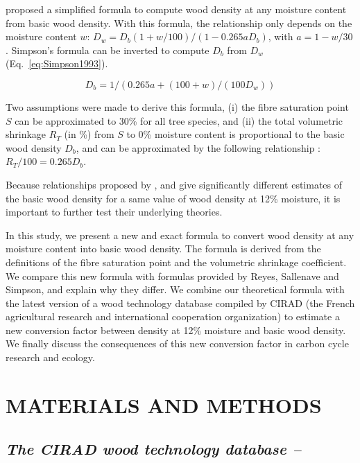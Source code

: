 \documentclass[a4paper, 12pt, leqno, dvipsnames]{article}\usepackage[]{graphicx}\usepackage[]{color}
\begin{document}
\citet{Simpson1993} proposed a simplified formula to compute wood density at any moisture content from basic wood density. With this formula, the relationship only depends on the moisture content $w$: $D_w=D_b(1+w/100)/(1-0.265aD_b)$, with $a=1-w/30$. Simpson's formula can be inverted to compute $D_b$ from $D_w$ (Eq.~\ref{eq:Simpson1993}).

\begin{equation}
  \label{eq:Simpson1993}
  D_b=1/(0.265a+(100+w)/(100D_w))
\end{equation}

Two assumptions were made to derive this formula, (i) the fibre saturation point $S$ can be approximated to 30\% for all tree species, and (ii) the total volumetric shrinkage $R_T$ (in \%) from $S$ to 0\% moisture content is proportional to the basic wood density $D_b$, and can be approximated by the following relationship \citep{Stamm1964}: $R_T/100=0.265 D_b$. 

Because relationships proposed by \citet{Reyes1992}, \citet{Sallenave1971} and \citet{Simpson1993} give significantly different estimates of the basic wood density for a same value of wood density at 12\% moisture, it is important to further test their underlying theories. 

In this study, we present a new and exact formula to convert wood density at any moisture content into basic wood density. The formula is derived from the definitions of the fibre saturation point and the volumetric shrinkage coefficient. We compare this new formula with formulas provided by Reyes, Sallenave and Simpson, and explain why they differ. We combine our theoretical formula with the latest version of a wood technology database compiled by CIRAD (the French agricultural research and international cooperation organization) to estimate a new conversion factor between density at 12\% moisture and basic wood density. We finally discuss the consequences of this new conversion factor in carbon cycle research and ecology.

\newpage

\section*{MATERIALS AND METHODS}

\subsection*{\textit{The CIRAD wood technology database --}}
\end{document}
